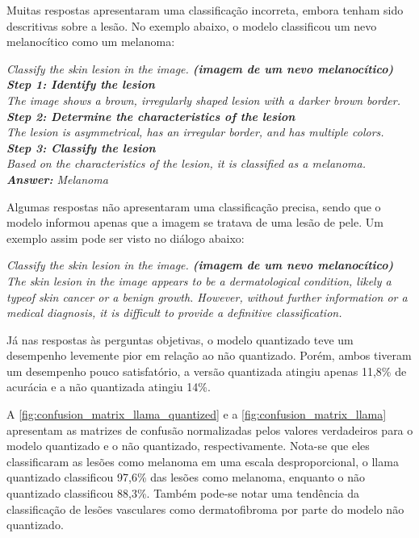 Muitas respostas apresentaram uma classificação incorreta, embora tenham sido descritivas sobre a lesão. No exemplo
abaixo, o modelo classificou um nevo melanocítico como um melanoma:

\begin{dialogue}
     \textit{Classify the skin lesion in the image. \textbf{(imagem de um nevo melanocítico)}} \\
     \textit{\textbf{Step 1: Identify the lesion} \\
    The image shows a brown, irregularly shaped lesion with a darker brown border. \\
    \textbf{Step 2: Determine the characteristics of the lesion} \\
    The lesion is asymmetrical, has an irregular border, and has multiple colors. \\
    \textbf{Step 3: Classify the lesion} \\
    Based on the characteristics of the lesion, it is classified as a melanoma. \\
    \textbf{Answer:} Melanoma}
\end{dialogue}

Algumas respostas não apresentaram uma classificação precisa, sendo que o modelo informou apenas que a imagem se
tratava de uma lesão de pele. Um exemplo assim pode ser visto no diálogo abaixo:

\begin{dialogue}
     \textit{Classify the skin lesion in the image. \textbf{(imagem de um nevo melanocítico)}} \\
     \textit{The skin lesion in the image appears to be a dermatological condition, likely a typeof skin
    cancer or a
    benign growth. However, without
    further information or a medical diagnosis, it is difficult to provide a definitive classification.}
\end{dialogue}

Já nas respostas às perguntas objetivas, o modelo quantizado teve um desempenho levemente pior em relação ao não
quantizado. Porém, ambos tiveram um desempenho pouco satisfatório, a versão quantizada atingiu apenas 11,8\% de
acurácia e a não quantizada atingiu 14\%.

A \autoref{fig:confusion_matrix_llama_quantized} e a \autoref{fig:confusion_matrix_llama} apresentam as matrizes de
confusão normalizadas pelos valores verdadeiros para o modelo quantizado e o não quantizado, respectivamente. Nota-se
que eles classificaram as lesões como melanoma em uma escala desproporcional, o \ac{llama} quantizado classificou
97,6\% das lesões como melanoma, enquanto o não quantizado classificou 88,3\%. Também pode-se notar uma tendência da
classificação de lesões vasculares como dermatofibroma por parte do modelo não quantizado.

